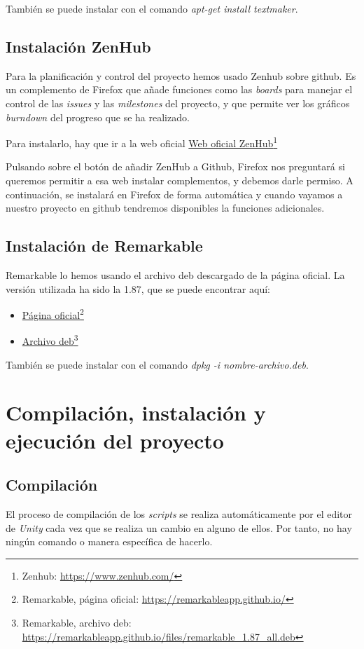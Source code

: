 También se puede instalar con el comando \textit{apt-get install textmaker}.

\subsection{Instalación ZenHub}

Para la planificación y control del proyecto hemos usado Zenhub sobre github. Es un complemento de Firefox que añade funciones como las \textit{boards} para manejar el control de las \textit{issues} y las \textit{milestones} del proyecto, y que permite ver los gráficos \textit{burndown} del progreso que se ha realizado.

Para instalarlo, hay que ir a la web oficial
\href{https://www.zenhub.com/}{Web oficial ZenHub}\footnote{Zenhub: \url{https://www.zenhub.com/}}

Pulsando sobre el botón de añadir ZenHub a Github, Firefox nos preguntará si queremos permitir a esa web instalar complementos, y debemos darle permiso. A continuación, se instalará en Firefox de forma automática y cuando vayamos a nuestro proyecto en github tendremos disponibles la funciones adicionales.

\subsection{Instalación de Remarkable}
Remarkable lo hemos usando el archivo deb descargado de la página oficial. La versión utilizada ha sido la 1.87, que se puede encontrar aquí:

\begin{itemize}
\item \href{https://remarkableapp.github.io/}{Página oficial}\footnote{Remarkable, página oficial: \url{https://remarkableapp.github.io/}}
\item \href{https://remarkableapp.github.io/files/remarkable_1.87_all.deb
}{Archivo deb}\footnote{Remarkable, archivo deb: \url{https://remarkableapp.github.io/files/remarkable_1.87_all.deb}}
\end{itemize}

También se puede instalar con el comando \textit{dpkg -i nombre-archivo.deb}.

\section{Compilación, instalación y ejecución del proyecto}
\subsection{Compilación}
El proceso de compilación de los \textit{scripts} se realiza automáticamente por el editor de \textit{Unity} cada vez que se realiza un cambio en alguno de ellos. Por tanto, no hay ningún comando o manera específica de hacerlo.


